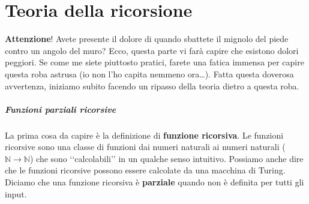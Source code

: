 \documentclass[a4paper,oneside]{scrbook}
\begin{document}
\chapter{Teoria della ricorsione}
\textbf{Attenzione}! Avete presente il dolore di quando sbattete il mignolo del piede contro un angolo del muro?
Ecco, questa parte vi farà capire che esistono dolori peggiori. Se come me siete piuttosto pratici, farete una fatica
immensa per capire questa roba astrusa (io non l'ho capita nemmeno ora\dots).
Fatta questa doverosa avvertenza, iniziamo subito facendo un ripasso della teoria dietro a questa roba.

\paragraph{Funzioni parziali ricorsive}
La prima cosa da capire è la definizione di \textbf{funzione ricorsiva}. Le funzioni ricorsive sono una classe di funzioni dai 
numeri naturali ai numeri naturali ($\mathbb{N}\rightarrow\mathbb{N}$) che sono ‘‘calcolabili’’ in un qualche senso intuitivo.
Possiamo anche dire che le funzioni ricorsive possono essere calcolate da una macchina di Turing.
Diciamo che una funzione ricorsiva è \textbf{parziale} quando non è definita per tutti gli input.
\end{document}
